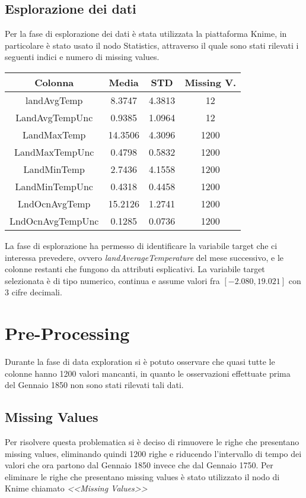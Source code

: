 \documentclass[10pt, a4paper, twocolumn]{article} %
\begin{document}
\subsection{Esplorazione dei dati}
Per la fase di esplorazione dei dati è stata utilizzata la piattaforma Knime, in particolare è stato usato il nodo Statistics, attraverso il quale sono stati rilevati i seguenti indici e numero di missing values.
%
\begin{center}
\begin{tabular}{||c c c c||} 
 \hline
 Colonna  & Media & STD & Missing V. \\ [0.5ex] 
 \hline\hline
	landAvgTemp &   8.3747 & 4.3813 & 12 \\
\hline\hline
	LandAvgTempUnc &   0.9385& 1.0964 & 12 \\
	\hline\hline
	LandMaxTemp & 14.3506 & 4.3096 & 1200 \\
	\hline\hline
	LandMaxTempUnc & 0.4798 & 0.5832 & 1200 \\
	\hline\hline
	LandMinTemp &2.7436 & 4.1558 & 1200 \\
	\hline\hline
	LandMinTempUnc & 0.4318 & 0.4458 & 1200 \\
	\hline\hline
	LndOcnAvgTemp & 15.2126 & 1.2741 & 1200 \\
	\hline\hline
	LndOcnAvgTempUnc & 0.1285 & 0.0736 & 1200 \\[0.5ex] \hline 
\end{tabular}
\end{center}

La fase di esplorazione ha permesso di identificare la variabile target che ci interessa prevedere, ovvero \textit{landAverageTemperature} del mese successivo, e le colonne restanti che fungono da attributi esplicativi.
La variabile target selezionata è di tipo numerico, continua e assume valori fra $[-2.080, 19.021]$ con 3 cifre decimali.

\section{Pre-Processing}
Durante la fase di data exploration si è potuto osservare che quasi tutte le colonne hanno 1200 valori mancanti, in quanto le osservazioni effettuate prima del Gennaio 1850 non sono stati rilevati tali dati. 
\subsection{Missing Values}
Per risolvere questa problematica si è deciso di rimuovere le righe che presentano missing values, eliminando quindi 1200 righe e riducendo l'intervallo di tempo dei valori che ora partono dal Gennaio 1850 invece che dal Gennaio 1750. Per eliminare le righe che presentano missing values è stato utilizzato il nodo di Knime chiamato \textit{<<Missing Values>>}
\end{document}
